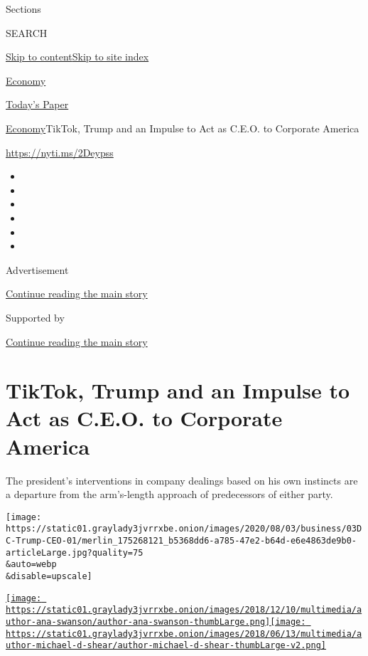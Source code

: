 Sections

SEARCH

\protect\hyperlink{site-content}{Skip to
content}\protect\hyperlink{site-index}{Skip to site index}

\href{https://www.nytimes3xbfgragh.onion/section/business/economy}{Economy}

\href{https://myaccount.nytimes3xbfgragh.onion/auth/login?response_type=cookie\&client_id=vi}{}

\href{https://www.nytimes3xbfgragh.onion/section/todayspaper}{Today's
Paper}

\href{/section/business/economy}{Economy}\textbar{}TikTok, Trump and an
Impulse to Act as C.E.O. to Corporate America

\url{https://nyti.ms/2Deypss}

\begin{itemize}
\item
\item
\item
\item
\item
\item
\end{itemize}

Advertisement

\protect\hyperlink{after-top}{Continue reading the main story}

Supported by

\protect\hyperlink{after-sponsor}{Continue reading the main story}

\hypertarget{tiktok-trump-and-an-impulse-to-act-as-ceo-to-corporate-america}{%
\section{TikTok, Trump and an Impulse to Act as C.E.O. to Corporate
America}\label{tiktok-trump-and-an-impulse-to-act-as-ceo-to-corporate-america}}

The president's interventions in company dealings based on his own
instincts are a departure from the arm's-length approach of predecessors
of either party.

\texttt{[image: https://static01.graylady3jvrrxbe.onion/images/2020/08/03/business/03DC-Trump-CEO-01/merlin\_175268121\_b5368dd6-a785-47e2-b64d-e6e4863de9b0-articleLarge.jpg?quality=75\\\&auto=webp\\\&disable=upscale]}

\href{https://www.nytimes3xbfgragh.onion/by/ana-swanson}{\texttt{[image: https://static01.graylady3jvrrxbe.onion/images/2018/12/10/multimedia/author-ana-swanson/author-ana-swanson-thumbLarge.png]}}\href{https://www.nytimes3xbfgragh.onion/by/michael-d-shear}{\texttt{[image: https://static01.graylady3jvrrxbe.onion/images/2018/06/13/multimedia/author-michael-d-shear/author-michael-d-shear-thumbLarge-v2.png]}}

